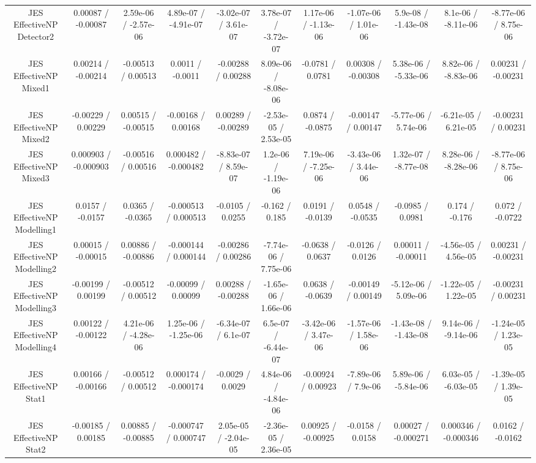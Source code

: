 \begin{table}[htbp]
\begin{center}
\begin{tabular}{|c|c|c|c|c|c|c|c|c|c|c|}
  JES EffectiveNP Detector2 & 0.00087 / -0.00087 & 2.59e-06 / -2.57e-06 & 4.89e-07 / -4.91e-07 & -3.02e-07 / 3.61e-07 & 3.78e-07 / -3.72e-07 & 1.17e-06 / -1.13e-06 & -1.07e-06 / 1.01e-06 & 5.9e-08 / -1.43e-08 & 8.1e-06 / -8.11e-06 & -8.77e-06 / 8.75e-06 \\ 
  JES EffectiveNP Mixed1 & 0.00214 / -0.00214 & -0.00513 / 0.00513 & 0.0011 / -0.0011 & -0.00288 / 0.00288 & 8.09e-06 / -8.08e-06 & -0.0781 / 0.0781 & 0.00308 / -0.00308 & 5.38e-06 / -5.33e-06 & 8.82e-06 / -8.83e-06 & 0.00231 / -0.00231 \\ 
  JES EffectiveNP Mixed2 & -0.00229 / 0.00229 & 0.00515 / -0.00515 & -0.00168 / 0.00168 & 0.00289 / -0.00289 & -2.53e-05 / 2.53e-05 & 0.0874 / -0.0875 & -0.00147 / 0.00147 & -5.77e-06 / 5.74e-06 & -6.21e-05 / 6.21e-05 & -0.00231 / 0.00231 \\ 
  JES EffectiveNP Mixed3 & 0.000903 / -0.000903 & -0.00516 / 0.00516 & 0.000482 / -0.000482 & -8.83e-07 / 8.59e-07 & 1.2e-06 / -1.19e-06 & 7.19e-06 / -7.25e-06 & -3.43e-06 / 3.44e-06 & 1.32e-07 / -8.77e-08 & 8.28e-06 / -8.28e-06 & -8.77e-06 / 8.75e-06 \\ 
  JES EffectiveNP Modelling1 & 0.0157 / -0.0157 & 0.0365 / -0.0365 & -0.000513 / 0.000513 & -0.0105 / 0.0255 & -0.162 / 0.185 & 0.0191 / -0.0139 & 0.0548 / -0.0535 & -0.0985 / 0.0981 & 0.174 / -0.176 & 0.072 / -0.0722 \\ 
  JES EffectiveNP Modelling2 & 0.00015 / -0.00015 & 0.00886 / -0.00886 & -0.000144 / 0.000144 & -0.00286 / 0.00286 & -7.74e-06 / 7.75e-06 & -0.0638 / 0.0637 & -0.0126 / 0.0126 & 0.00011 / -0.00011 & -4.56e-05 / 4.56e-05 & 0.00231 / -0.00231 \\ 
  JES EffectiveNP Modelling3 & -0.00199 / 0.00199 & -0.00512 / 0.00512 & -0.00099 / 0.00099 & 0.00288 / -0.00288 & -1.65e-06 / 1.66e-06 & 0.0638 / -0.0639 & -0.00149 / 0.00149 & -5.12e-06 / 5.09e-06 & -1.22e-05 / 1.22e-05 & -0.00231 / 0.00231 \\ 
  JES EffectiveNP Modelling4 & 0.00122 / -0.00122 & 4.21e-06 / -4.28e-06 & 1.25e-06 / -1.25e-06 & -6.34e-07 / 6.1e-07 & 6.5e-07 / -6.44e-07 & -3.42e-06 / 3.47e-06 & -1.57e-06 / 1.58e-06 & -1.43e-08 / -1.43e-08 & 9.14e-06 / -9.14e-06 & -1.24e-05 / 1.23e-05 \\ 
  JES EffectiveNP Stat1 & 0.00166 / -0.00166 & -0.00512 / 0.00512 & 0.000174 / -0.000174 & -0.0029 / 0.0029 & 4.84e-06 / -4.84e-06 & -0.00924 / 0.00923 & -7.89e-06 / 7.9e-06 & 5.89e-06 / -5.84e-06 & 6.03e-05 / -6.03e-05 & -1.39e-05 / 1.39e-05 \\ 
  JES EffectiveNP Stat2 & -0.00185 / 0.00185 & 0.00885 / -0.00885 & -0.000747 / 0.000747 & 2.05e-05 / -2.04e-05 & -2.36e-05 / 2.36e-05 & 0.00925 / -0.00925 & -0.0158 / 0.0158 & 0.00027 / -0.000271 & 0.000346 / -0.000346 & 0.0162 / -0.0162 \\ 

\end{tabular}
\end{center}
\end{table}
